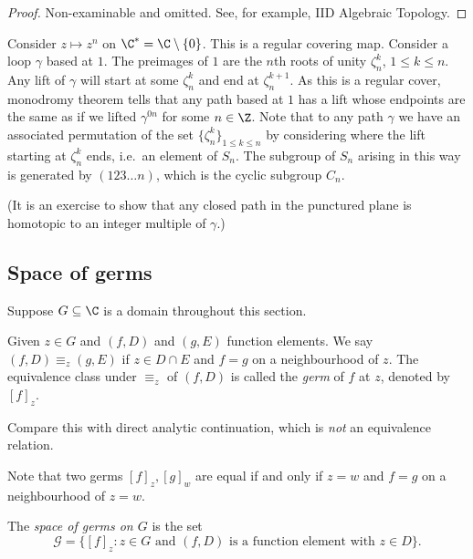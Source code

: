 \documentclass[a4paper]{article}
\begin{document}
\begin{proof}
  Non-examinable and omitted. See, for example, IID Algebraic Topology.
\end{proof}

\begin{eg}
  Consider \(z \mapsto z^n\) on \(\C^* = \C \setminus \{0\}\). This is a regular covering map. Consider a loop \(\gamma\) based at \(1\). The preimages of \(1\) are the \(n\)th roots of unity \(\zeta_n^k\), \(1 \leq k \leq n\). Any lift of \(\gamma\) will start at some \(\zeta_n^k\) and end at \(\zeta_n^{k + 1}\). As this is a regular cover, monodromy theorem tells that any path based at \(1\) has a lift whose endpoints are the same as if we lifted \(\gamma^{0n}\) for some \(n \in \Z\). Note that to any path \(\gamma\) we have an associated permutation of the set \(\{\zeta_n^k\}_{1 \leq k \leq n}\) by considering where the lift starting at \(\zeta_n^k\) ends, i.e.\ an element of \(S_n\). The subgroup of \(S_n\) arising in this way is generated by \((123\dots n)\), which is the cyclic subgroup \(C_n\).

  (It is an exercise to show that any closed path in the punctured plane is homotopic to an integer multiple of \(\gamma\).)
\end{eg}

\subsection{Space of germs}

Suppose \(G \subseteq \C\) is a domain throughout this section.

\begin{definition}[germ]
  Given \(z \in G\) and \((f, D)\) and \((g, E)\) function elements. We say \((f, D) \equiv_z (g, E)\) if \(z \in D \cap E\) and \(f = g\) on a neighbourhood of \(z\). The equivalence class under \(\equiv_z\) of \((f, D)\) is called the \emph{germ} of \(f\) at \(z\), denoted by \([f]_z\).
\end{definition}

Compare this with direct analytic continuation, which is \emph{not} an equivalence relation.

Note that two germs \([f]_z, [g]_w\) are equal if and only if \(z = w\) and \(f = g\) on a neighbourhood of \(z = w\).

\begin{definition}
  The \emph{space of germs on \(G\)} is the set
  \[
    \mathcal G = \{[f]_z: z \in G \text{ and } (f, D) \text{ is a function element with } z \in D\}.
  \]
\end{definition}
\end{document}
